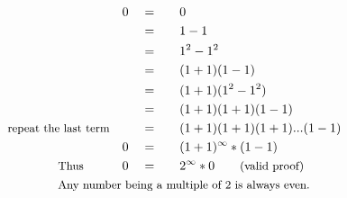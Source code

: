\begin{alignat*}{5}
&\,&0\quad&=\quad&&0\\
&\,&\,&=&&1-1\\
&\,&\,&=&&1^2-1^2\\
&\,&\,&=&&(1+1)(1-1)\\
&\,&\,&=&&(1+1)(1^2-1^2)\\
&\,&\,&=&&(1+1)(1+1)(1-1)\\
&\small\text{repeat the last term}&\,&=&&(1+1)(1+1)(1+1)...(1-1)\\
&\,&0\quad&=&&(1+1)^\infty*(1-1)\\
&\qquad\qquad\small\text{Thus}\normalsize\qquad&0\quad&=&&2^\infty*0\qquad\small\text{(valid proof)}\\
&\rlap{\qquad\qquad\small\text{Any number being a multiple of 2 is always even.}}
\end{alignat*}
